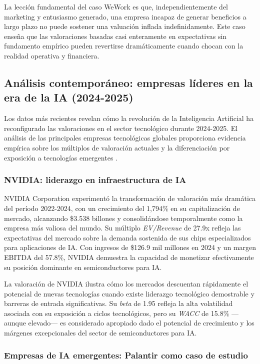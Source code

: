 La lección fundamental del caso WeWork es que, independientemente del marketing y entusiasmo generado, una empresa incapaz de generar beneficios a largo plazo no puede sostener una valuación inflada indefinidamente. Este caso enseña que las valoraciones basadas casi enteramente en expectativas sin fundamento empírico pueden revertirse dramáticamente cuando chocan con la realidad operativa y financiera.

\subsection{Análisis contemporáneo: empresas líderes en la era de la IA (2024-2025)}

Los datos más recientes revelan cómo la revolución de la Inteligencia Artificial ha reconfigurado las valoraciones en el sector tecnológico durante 2024-2025. El análisis de las principales empresas tecnológicas globales proporciona evidencia empírica sobre los múltiplos de valoración actuales y la diferenciación por exposición a tecnologías emergentes \citep{techanalysis2024}.

\subsubsection{NVIDIA: liderazgo en infraestructura de IA}

NVIDIA Corporation experimentó la transformación de valoración más dramática del período 2022-2024, con un crecimiento del 1,794\% en su capitalización de mercado, alcanzando \$3.538 billones y consolidándose temporalmente como la empresa más valiosa del mundo. Su múltiplo \emph{EV/Revenue} de 27.9x refleja las expectativas del mercado sobre la demanda sostenida de sus chips especializados para aplicaciones de IA. Con ingresos de \$126.9 mil millones en 2024 y un margen EBITDA del 57.8\%, NVIDIA demuestra la capacidad de monetizar efectivamente su posición dominante en semiconductores para IA.

La valoración de NVIDIA ilustra cómo los mercados descuentan rápidamente el potencial de nuevas tecnologías cuando existe liderazgo tecnológico demostrable y barreras de entrada significativas. Su \emph{beta} de 1.95 refleja la alta volatilidad asociada con su exposición a ciclos tecnológicos, pero su \emph{WACC} de 15.8\% ---aunque elevado--- es considerado apropiado dado el potencial de crecimiento y los márgenes excepcionales del sector de semiconductores para IA.

\subsubsection{Empresas de IA emergentes: Palantir como caso de estudio}


